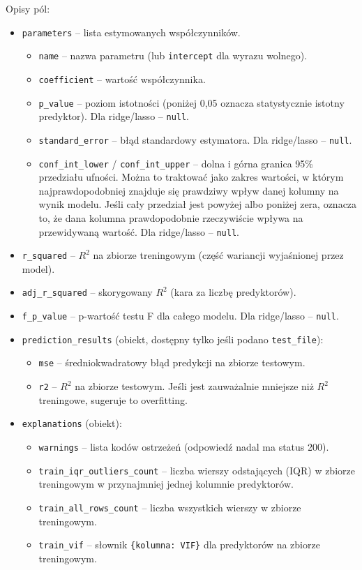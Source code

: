 \documentclass[12pt,a4paper]{article}
\begin{document}
Opisy pól:
\begin{itemize}
    \item \texttt{parameters} – lista estymowanych współczynników.
        \begin{itemize}
            \item \texttt{name} – nazwa parametru (lub \texttt{intercept} dla wyrazu wolnego).
            \item \texttt{coefficient} – wartość współczynnika.
            \item \texttt{p\_value} – poziom istotności (poniżej 0,05 oznacza statystycznie istotny predyktor). Dla ridge/lasso – \texttt{null}.
            \item \texttt{standard\_error} – błąd standardowy estymatora. Dla ridge/lasso – \texttt{null}.
            \item \texttt{conf\_int\_lower} / \texttt{conf\_int\_upper} – dolna i górna granica 95\% przedziału ufności. Można to traktować jako zakres wartości, w którym najprawdopodobniej znajduje się prawdziwy wpływ danej kolumny na wynik modelu. Jeśli cały przedział jest powyżej albo poniżej zera, oznacza to, że dana kolumna prawdopodobnie rzeczywiście wpływa na przewidywaną wartość. Dla ridge/lasso – \texttt{null}.
        \end{itemize}
    \item \texttt{r\_squared} – \(R^2\) na zbiorze treningowym (część wariancji wyjaśnionej przez model).
    \item \texttt{adj\_r\_squared} – skorygowany \(R^2\) (kara za liczbę predyktorów).
    \item \texttt{f\_p\_value} – p-wartość testu F dla całego modelu. Dla ridge/lasso – \texttt{null}.
    \item \texttt{prediction\_results} (obiekt, dostępny tylko jeśli podano \texttt{test\_file}):
        \begin{itemize}
            \item \texttt{mse} – średniokwadratowy błąd predykcji na zbiorze testowym.
            \item \texttt{r2} – \(R^2\) na zbiorze testowym. Jeśli jest zauważalnie mniejsze niż \(R^2\) treningowe, sugeruje to overfitting.
        \end{itemize}
    \item \texttt{explanations} (obiekt):
        \begin{itemize}
            \item \texttt{warnings} – lista kodów ostrzeżeń (odpowiedź nadal ma status 200).
            \item \texttt{train\_iqr\_outliers\_count} – liczba wierszy odstających (IQR) w zbiorze treningowym w przynajmniej jednej kolumnie predyktorów.
            \item \texttt{train\_all\_rows\_count} – liczba wszystkich wierszy w zbiorze treningowym.
            \item \texttt{train\_vif} – słownik \texttt{\{kolumna: VIF\}} dla predyktorów na zbiorze treningowym.
        \end{itemize}
\end{itemize}
\end{document}
